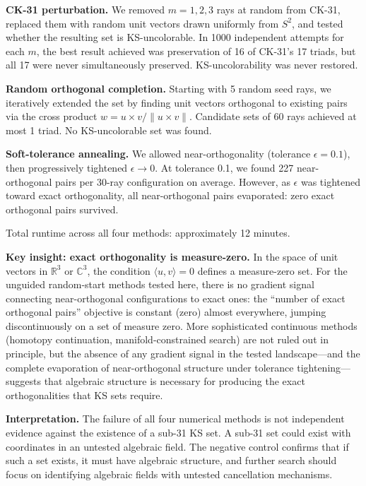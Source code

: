 \documentclass[twocolumn,pra,superscriptaddress,nofootinbib]{revtex4-2}
\newcommand{\R}{\mathbb{R}}
\newcommand{\C}{\mathbb{C}}
\begin{document}
\textbf{CK-31 perturbation.} We removed $m = 1, 2, 3$ rays at random from CK-31, replaced them with random unit vectors drawn uniformly from $S^2$, and tested whether the resulting set is KS-uncolorable. In 1000 independent attempts for each $m$, the best result achieved was preservation of 16 of CK-31's 17 triads, but all 17 were never simultaneously preserved. KS-uncolorability was never restored.

\textbf{Random orthogonal completion.} Starting with 5 random seed rays, we iteratively extended the set by finding unit vectors orthogonal to existing pairs via the cross product $w = u \times v / \|u \times v\|$. Candidate sets of 60 rays achieved at most 1 triad. No KS-uncolorable set was found.

\textbf{Soft-tolerance annealing.} We allowed near-orthogonality (tolerance $\epsilon = 0.1$), then progressively tightened $\epsilon \to 0$. At tolerance 0.1, we found 227 near-orthogonal pairs per 30-ray configuration on average. However, as $\epsilon$ was tightened toward exact orthogonality, all near-orthogonal pairs evaporated: zero exact orthogonal pairs survived.

Total runtime across all four methods: approximately 12 minutes.

\textbf{Key insight: exact orthogonality is measure-zero.} In the space of unit vectors in $\R^3$ or $\C^3$, the condition $\langle u, v \rangle = 0$ defines a measure-zero set. For the unguided random-start methods tested here, there is no gradient signal connecting near-orthogonal configurations to exact ones: the ``number of exact orthogonal pairs'' objective is constant (zero) almost everywhere, jumping discontinuously on a set of measure zero. More sophisticated continuous methods (homotopy continuation, manifold-constrained search) are not ruled out in principle, but the absence of any gradient signal in the tested landscape---and the complete evaporation of near-orthogonal structure under tolerance tightening---suggests that algebraic structure is necessary for producing the exact orthogonalities that KS sets require.

\textbf{Interpretation.} The failure of all four numerical methods is not independent evidence against the existence of a sub-31 KS set. A sub-31 set could exist with coordinates in an untested algebraic field. The negative control confirms that if such a set exists, it must have algebraic structure, and further search should focus on identifying algebraic fields with untested cancellation mechanisms.
\end{document}
